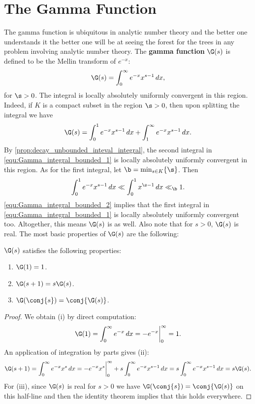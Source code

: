     \section{The Gamma Function}
      The gamma function is ubiquitous in analytic number theory and the better one understands it the better one will be at seeing the forest for the trees in any problem involving analytic number theory. The \textbf{gamma function} $\G(s)$ is defined to be the Mellin transform of $e^{-x}$:
      \[
        \G(s) = \int_{0}^{\infty}e^{-x}x^{s-1}\,dx,
      \]
      for $\s > 0$. The integral is locally absolutely uniformly convergent in this region. Indeed, if $K$ is a compact subset in the region $\s > 0$, then upon splitting the integral we have
      \begin{equation}\label{equ:Gamma_integral_bounded_1}
        \G(s) = \int_{0}^{1}e^{-x}x^{s-1}\,dx+\int_{1}^{\infty}e^{-x}x^{s-1}\,dx.
      \end{equation}
      By \cref{prop:decay_unbounded_inteval_integral}, the second integral in \cref{equ:Gamma_integral_bounded_1} is locally absolutely uniformly convergent in this region. As for the first integral, let $\b = \min_{s \in K}\{\s\}$. Then
      \begin{equation}\label{equ:Gamma_integral_bounded_2}
        \int_{0}^{1}e^{-x}x^{s-1}\,dx \ll \int_{0}^{1}x^{\s-1}\,dx \ll_{\b} 1.
      \end{equation}
      \cref{equ:Gamma_integral_bounded_2} implies that the first integral in \cref{equ:Gamma_integral_bounded_1} is locally absolutely uniformly convergent too. Altogether, this means $\G(s)$ is as well. Also note that for $s >0$, $\G(s)$ is real. The most basic properties of $\G(s)$ are the following:

      \begin{proposition}\label{prop:Factorial_properties_of_gamma_function}
        $\G(s)$ satisfies the following properties:
        \begin{enumerate}[label=(\roman*)]
          \item $\G(1) = 1$.
          \item $\G(s+1) = s\G(s)$.
          \item $\G(\conj{s}) = \conj{\G(s)}$.
        \end{enumerate}
      \end{proposition}
      \begin{proof}
        We obtain (i) by direct computation:
        \[
          \G(1) = \int_{0}^{\infty}e^{-x}\,dx = -e^{-x}\bigg|_{0}^{\infty} = 1.
        \]
        An application of integration by parts gives (ii):
        \[
          \G(s+1) = \int_{0}^{\infty}e^{-x}x^{s}\,dx = -e^{-x}x^{s}\bigg|_{0}^{\infty}+s\int_{0}^{\infty}e^{-x}x^{s-1}\,dx = s\int_{0}^{\infty}e^{-x}x^{s-1}\,dx = s\G(s).
        \]
        For (iii), since $\G(s)$ is real for $s >0$ we have $\G(\conj{s}) = \conj{\G(s)}$ on this half-line and then the identity theorem implies that this holds everywhere.
      \end{proof}

